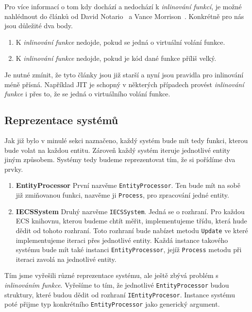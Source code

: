 Pro více informací o tom kdy dochází a nedochází k \textit{inlinování funkcí}, je možné nahlédnout do článků od David Notario~\cite{Notario_2004} a Vance Morrison~\cite{Morrison_2008}. Konkrétně pro nás jsou důležité dva body.

\begin{enumerate}
    \item K \textit{inlinování funkce} nedojde, pokud se jedná o virtuální volání funkce.
    \item K \textit{inlinování funkce} nedojde, pokud je kód dané funkce příliš velký.
\end{enumerate}

Je nutné zmínit, že tyto články jsou již starší a nyní jsou pravidla pro inlinování méně přísná. Například JIT je schopný v některých případech provést \textit{inlinování funkce} i přes to, že se jedná o virtuálního volání funkce.

\subsection{Reprezentace systémů}
Jak již bylo v minulé sekci naznačeno, každý systém bude mít tedy funkci, kterou bude volat na každou entitu. Zároveň každý systém iteruje jednotlivé entity jiným způsobem. Systémy tedy budeme reprezentovat tím, že si pořídíme dva prvky.

\begin{enumerate}
    \item \textbf{EntityProcessor} První nazvěme \verb|EntityProcessor|. Ten bude mít na sobě již zmiňovanou funkci, nazvěme ji \verb|Process|, pro zpracování jedné entity.
    \item \textbf{IECSSystem} Druhý nazvěme \verb|IECSSystem|. Jedná se o rozhraní. Pro každou ECS knihovnu, kterou budeme chtít měřit, implementujeme třídu, která hude dědit od tohoto rozhraní. Toto rozhraní bude nabízet metodu \verb|Update| ve které implementujeme iteraci přes jednotlivé entity. Každá instance takového systému bude mít také instanci \verb|EntityProcessor|, jejíž \verb|Process| metodu při iteraci zavolá na jednotlivé entity.
\end{enumerate}

Tím jsme vyřešili různé reprezentace systému, ale ještě zbývá problém s \textit{inlinováním funkce}. Vyřešíme to tím, že jednotlivé \verb|EntityProcessor| budou struktury, které budou dědit od rozhraní \verb|IEntityProcesor|. Instance systému poté přijme typ konkrétního \verb|EntityProcessor| jako generický argument.

